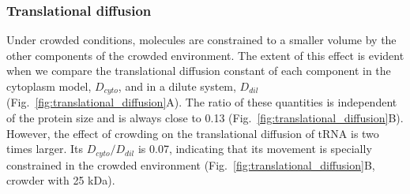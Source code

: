 \documentclass[journal=jacsat,manuscript=article]{achemso}
\begin{document}
\subsubsection{Translational diffusion}

Under crowded conditions, molecules are constrained to a smaller volume by the other components of the crowded environment. The extent of this effect is evident when we compare the translational diffusion constant of each component in the cytoplasm model, $D_{cyto}$, and in a dilute system, $D_{dil}$ (Fig.~\ref{fig:translational_diffusion}A). The ratio of these quantities is independent of the protein size and is always close to 0.13 (Fig.~\ref{fig:translational_diffusion}B). However, the effect of crowding on the translational diffusion of tRNA is two times larger. Its $D_{cyto}/D_{dil}$ is 0.07, indicating that its movement is specially constrained in the crowded environment (Fig.~\ref{fig:translational_diffusion}B, crowder with 25 kDa).
\end{document}

